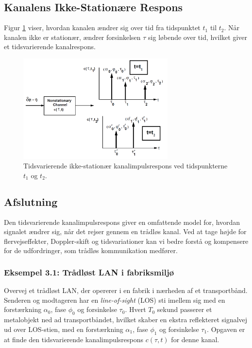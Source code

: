 \documentclass[a4paper,12pt]{book}
\begin{document}
	\subsection{Kanalens Ikke-Stationære Respons}
	Figur \ref{fig:nonstationary_channel} viser, hvordan kanalen ændrer sig over tid fra tidspunktet \( t_1 \) til \( t_2 \). Når kanalen ikke er stationær, ændrer forsinkelsen \( \tau \) sig løbende over tid, hvilket giver et tidsvarierende kanalrespons.
	\begin{figure}[h!]
		\centering
		\includegraphics[width=0.7\textwidth]{fig/fig17.png}
		\caption{Tidsvarierende ikke-stationær kanalimpulsrespons ved tidspunkterne \( t_1 \) og \( t_2 \).}
		\label{fig:nonstationary_channel}
	\end{figure}
	
	\subsection*{Afslutning}
	Den tidsvarierende kanalimpulsrespons giver en omfattende model for, hvordan signalet ændrer sig, når det rejser gennem en trådløs kanal. Ved at tage højde for flervejseffekter, Doppler-skift og tidsvariationer kan vi bedre forstå og kompensere for de udfordringer, som trådløs kommunikation medfører.
	
	\subsubsection*{Eksempel 3.1: Trådløst LAN i fabriksmiljø}
	Overvej et trådløst LAN, der opererer i en fabrik i nærheden af et transportbånd. Senderen og modtageren har en \textit{line-of-sight} (LOS) sti imellem sig med en forstærkning \( \alpha_0 \), fase \( \phi_0 \) og forsinkelse \( \tau_0 \). Hvert \( T_0 \) sekund passerer et metalobjekt ned ad transportbåndet, hvilket skaber en ekstra reflekteret signalvej ud over LOS-stien, med en forstærkning \( \alpha_1 \), fase \( \phi_1 \) og forsinkelse \( \tau_1 \). Opgaven er at finde den tidsvarierende kanalimpulsrespons \( c(\tau, t) \) for denne kanal.
	
\end{document}
